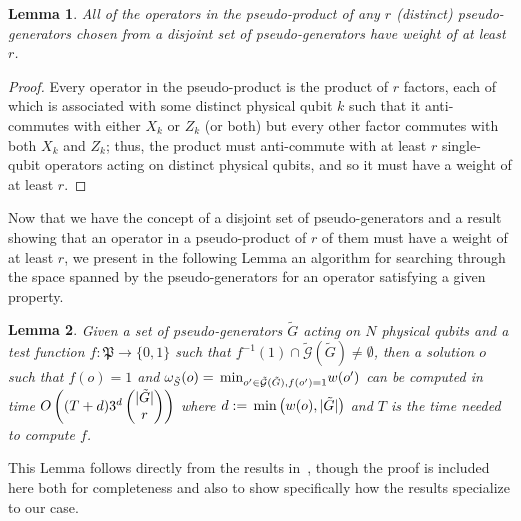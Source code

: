 \documentclass[twocolumn,showpacs,preprintnumbers,amsmath,amssymb,nofootinbib,pra,floatfix]{revtex4-1}
\newtheorem{lemma}{Lemma}
\newenvironment{remark}[1][Remark]{\begin{trivlist}
\item[\hskip \labelsep {\bfseries #1}]}{\end{trivlist}}
\newcommand{\set}{\tilde}
\newcommand{\genfun}{\tilde{\mathcal{G}}}
\newcommand{\pauligroup}{\mathfrak{P}}
\begin{document}
\begin{lemma}
\label{lemma:disjoint-pseudo-generators-bound}
All of the operators in the pseudo-product of any $r$ (distinct) pseudo-generators chosen from a disjoint set of pseudo-generators have weight of at least $r$.
\end{lemma}

\begin{proof}
Every operator in the pseudo-product is the product of $r$ factors, each of which is associated with some distinct physical qubit $k$ such that it anti-commutes with either $X_k$ or $Z_k$ (or both) but every other factor commutes with both $X_k$ and $Z_k$;  thus, the product must anti-commute with at least $r$ single-qubit operators acting on distinct physical qubits, and so it must have a weight of at least $r$.
\end{proof}
\begin{remark}
Now that we have the concept of a disjoint set of pseudo-generators and a result showing that an operator in a pseudo-product of $r$ of them must have a weight of at least $r$, we present in the following Lemma an algorithm for searching through the space spanned by the pseudo-generators for an operator satisfying a given property.
\end{remark}

\begin{lemma}
\label{lemma:minimal-weight-search}
Given a set of pseudo-generators $\set G$ acting on $N$ physical qubits and a test function $f:\pauligroup\to\{0,1\}$ such that $f^{-1}(1)\cap\genfun(\set G)\ne\emptyset$, then a solution $o$ such that $f(o)=1$ and $\om_{\set S}(o)=\min_{o'\in \genfun(\set G), f(o')=1} w(o')$ can be computed in time $O\paren{(T+d)3^d\choose{|\set G|}{r}}$ where $d:=\min\paren{w(o),|\set G|}$ and $T$ is the time needed to compute $f$.
\end{lemma}

\begin{remark}
This Lemma follows directly from the results in~\cite{White:2006fj}, though the proof is included here both for completeness and also to show specifically how the results specialize to our case.
\end{remark}
\end{document}

